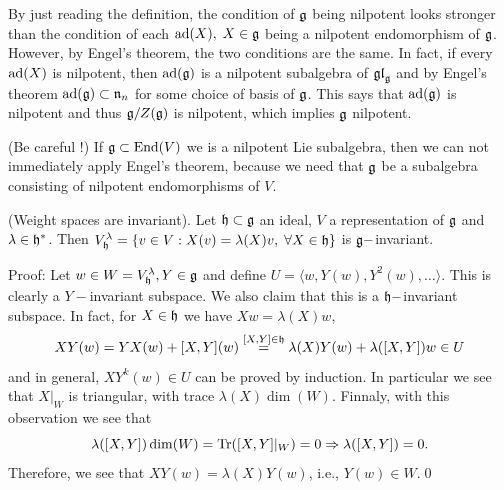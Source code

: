 \begin{dang}
    \begin{remark}
       By just reading the definition, the condition of $\mathfrak{g}$ being nilpotent looks stronger than the condition of each 
        $\text{ad}(X),\;X\in\mathfrak{g}$ being a nilpotent endomorphism of $\mathfrak{g}$. However, by Engel's theorem, the two conditions 
        are the same. In fact, if every $\text{ad}(X)$ is nilpotent, then $\text{ad}(\mathfrak{g})$ is a nilpotent subalgebra of $\mathfrak{gl}_{\mathfrak{g}}$
        and by Engel's theorem $\text{ad}(\mathfrak{g})\subset\mathfrak{n}_n$ for some choice of basis of $\mathfrak{g}$. This says that $\text{ad}(\mathfrak{g})$ is nilpotent
        and thus $\mathfrak{g}/Z(\mathfrak{g})$ is nilpotent, which implies $\mathfrak{g}$ nilpotent. 
    \end{remark}
\end{dang}

\begin{dang}
    \begin{remark}
        (Be careful !) If $\mathfrak{g}\subset\text{End}(V)$ we is a nilpotent Lie subalgebra, then we can not immediately 
        apply Engel's theorem, because we need that $\mathfrak{g}$ be a subalgebra consisting of nilpotent endomorphisms of $V$.
    \end{remark}
\end{dang}

\begin{dang}
    \begin{lemma}
        (Weight spaces are invariant). 
        Let $\mathfrak{h}\subset\mathfrak{g}$ an ideal, $V$ a representation of $\mathfrak{g}$ and $\lambda\in\mathfrak{h}^*$. Then 
        $V_{\mathfrak{h}}^\lambda = \{v\in V: X(v)=\lambda(X)v,\;\forall X\in\mathfrak{h}\}$ is $\mathfrak{g}-$invariant.
    \end{lemma}
\end{dang}
Proof: Let $w\in W=V_{\mathfrak{h}}^\lambda, Y\in\mathfrak{g}$ and define $U=\langle w,Y(w),Y^2(w),\dots \rangle$. This is clearly a $Y-$invariant 
subspace. We also claim that this is a $\mathfrak{h}-$invariant subspace. In fact, for $X\in\mathfrak{h}$ we have $Xw=\lambda(X)w$, 
\begin{equation}
XY(w)=YX(w)+[X,Y](w)\overset{[X,Y]\in\mathfrak{h}}{=}\lambda(X)Y(w)+\lambda([X,Y])w \in U
\end{equation} 
and in general, $XY^k(w)\in U$ can be proved by induction. In particular we see that $X|_W$ is triangular, with trace 
$\lambda(X)\dim(W)$. Finnaly, with this observation we see that 
\begin{equation}
    \lambda([X,Y])\dim(W)=\text{Tr}([X,Y]|_W)=0\Rightarrow \lambda([X,Y])=0.
\end{equation}
Therefore, we see that $XY(w)=\lambda(X)Y(w)$, i.e., $Y(w)\in W$.\qed

